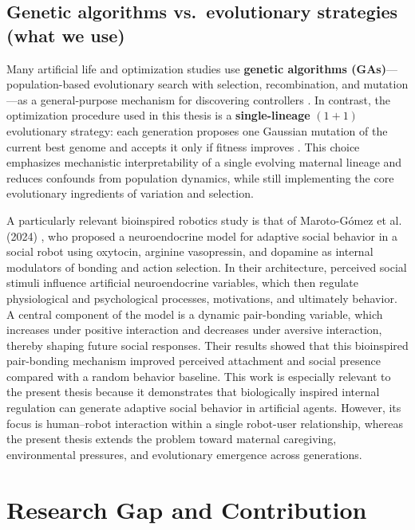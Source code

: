     \subsection{Genetic algorithms vs.\ evolutionary strategies (what we use)}
        Many artificial life and optimization studies use \textbf{genetic algorithms (GAs)}---population-based evolutionary search with selection, recombination, and mutation---as a general-purpose mechanism for discovering controllers \cite{holland1975, goldberg1989}. In contrast, the optimization procedure used in this thesis is a \textbf{single-lineage} $(1{+}1)$ evolutionary strategy: each generation proposes one Gaussian mutation of the current best genome and accepts it only if fitness improves \cite{rechenberg1973, schwefel1977}. This choice emphasizes mechanistic interpretability of a single evolving maternal lineage and reduces confounds from population dynamics, while still implementing the core evolutionary ingredients of variation and selection.

    

        A particularly relevant bioinspired robotics study is that of Maroto-Gómez et al. (2024) \cite{marotogomez2024}, who proposed a neuroendocrine model for adaptive social behavior in a social robot using oxytocin, arginine vasopressin, and dopamine as internal modulators of bonding and action selection. In their architecture, perceived social stimuli influence artificial neuroendocrine variables, which then regulate physiological and psychological processes, motivations, and ultimately behavior. A central component of the model is a dynamic pair-bonding variable, which increases under positive interaction and decreases under aversive interaction, thereby shaping future social responses. Their results showed that this bioinspired pair-bonding mechanism improved perceived attachment and social presence compared with a random behavior baseline. This work is especially relevant to the present thesis because it demonstrates that biologically inspired internal regulation can generate adaptive social behavior in artificial agents. However, its focus is human--robot interaction within a single robot-user relationship, whereas the present thesis extends the problem toward maternal caregiving, environmental pressures, and evolutionary emergence across generations.







\section{Research Gap and Contribution}

